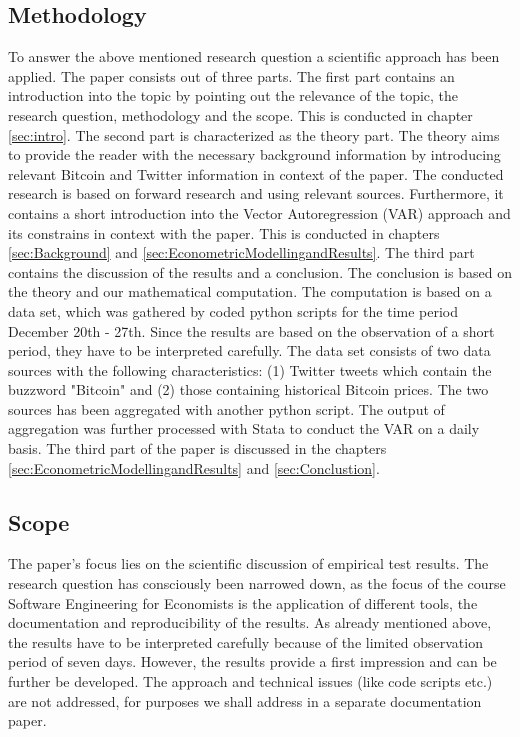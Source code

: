 \documentclass[a4paper,american,12pt]{article}
\begin{document}
\begin{spacing}{1.2}
\subsection{Methodology}
\label{sec:Methodology}
To answer the above mentioned research question a scientific approach has been applied. The paper consists out of three parts. The first part contains an introduction into the topic by pointing out the relevance of the topic, the research question, methodology and the scope. This is conducted in chapter \ref{sec:intro}. The second part is characterized as the theory part. The theory aims to provide the reader with the necessary background information by introducing relevant Bitcoin and Twitter information in context of the paper. The conducted research is based on forward research and using relevant sources. Furthermore, it contains a short introduction into the Vector Autoregression (VAR) approach and its constrains in context with the paper. This is conducted in chapters \ref{sec:Background} and \ref{sec:EconometricModellingandResults}. The third part contains the discussion of the results and a conclusion. The conclusion is based on the theory and our mathematical computation. The computation is based on a data set, which was gathered by coded python scripts for the time period December 20th - 27th. Since the results are based on the observation of a short period, they have to be interpreted carefully. The data set consists of two data sources with the following characteristics: (1) Twitter tweets which contain the buzzword "Bitcoin" and (2) those containing historical Bitcoin prices. The two sources has been aggregated with another python script. The output of aggregation was further processed with Stata to conduct the VAR on a daily basis. The third part of the paper is discussed in the chapters \ref{sec:EconometricModellingandResults} and \ref{sec:Conclustion}.

\subsection{Scope}
\label{sec:Scope}
The paper's focus lies on the scientific discussion of empirical test results. The research question has consciously been narrowed down, as the focus of the course Software Engineering for Economists is the application of different tools, the documentation and reproducibility of the results. As already mentioned above, the results have to be interpreted carefully because of the limited observation period of seven days. However, the results provide a first impression and can be further be developed. The approach and technical issues (like code scripts etc.) are not addressed, for purposes we shall address in a separate documentation paper.


\end{spacing}
\end{document}
